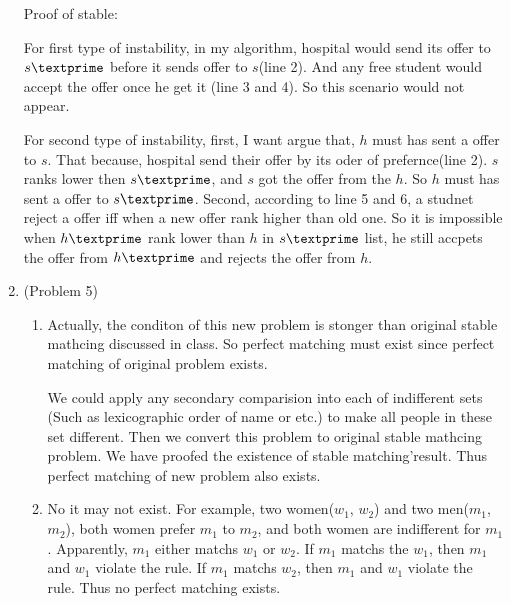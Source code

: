 \normalfont\documentclass[letterpaper,11pt]{article}
\begin{document}
\begin{enumerate}
Proof of stable:\par
For first type of instability, in my algorithm, hospital would send its offer to $s\textprime$ before it sends offer to $s$(line 2). And any free student would accept the offer once he get it (line 3 and 4). So this scenario would not appear.\par
For second type of instability, first, I want argue that, $h$ must has sent a offer to $s$. That because, hospital send their offer by its oder of prefernce(line 2). $s$ ranks lower then $s\textprime$, and $s$ got the offer from the $h$. So $h$ must has sent a offer to $s\textprime$. Second, according to line 5 and 6, a studnet reject a offer iff when a new offer rank higher than old one. So it is impossible when $h\textprime$ rank lower than $h$ in $s\textprime$ list, he still accpets the offer from $h\textprime$ and rejects the offer from $h$.\par
\item (Problem 5) \par
	\begin{enumerate}
	\item
		Actually, the conditon of this new problem is stonger than original stable mathcing discussed in class. So perfect matching must exist since perfect matching of original problem exists.\par
		We could apply any secondary comparision into each of indifferent sets (Such as lexicographic order of name or etc.) to make all people in these set different. Then we convert this problem to original stable mathcing problem. We have proofed the existence of stable matching'result. Thus perfect matching of new problem also exists.\par
	\item
		No it may not exist. For example, two women($w_1$, $w_2$) and two men($m_1$,$m_2$), both women prefer $m_1$ to $m_2$, and both women are indifferent for $m_1$. Apparently, $m_1$ either matchs $w_1$ or $w_2$. If $m_1$ matchs the $w_1$, then $m_1$ and $w_1$ violate the rule. If $m_1$ matchs $w_2$, then $m_1$ and $w_1$ violate the rule. Thus no perfect matching exists.
	\end{enumerate}	
\end{enumerate}
\end{document}
